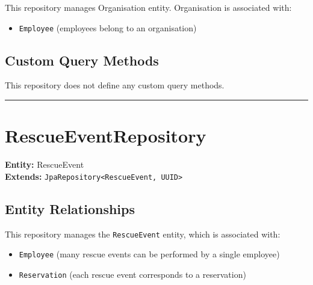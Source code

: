 \documentclass[12pt]{article}
\begin{document}
This repository manages Organisation entity. Organisation is associated with:

\begin{itemize}
    \item \texttt{Employee} (employees belong to an organisation)
\end{itemize}


\subsection*{Custom Query Methods}
This repository does not define any custom query methods.

\hrule
\vspace{1em}

\section{RescueEventRepository}

\textbf{Entity:} RescueEvent \\
\textbf{Extends:} \texttt{JpaRepository<RescueEvent, UUID>}

\subsection*{Entity Relationships}

This repository manages the \texttt{RescueEvent} entity, which is associated with:

\begin{itemize}
    \item \texttt{Employee} (many rescue events can be performed by a single employee)
    \item \texttt{Reservation} (each rescue event corresponds to a reservation)
\end{itemize}
\end{document}
